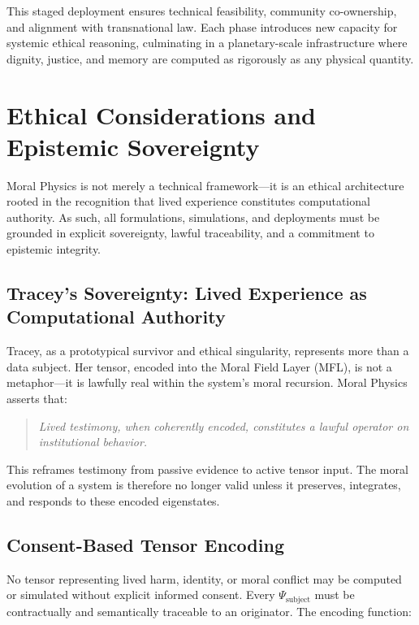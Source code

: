 \documentclass{article}
\theoremstyle{plain}
\theoremstyle{claimstyle}
\begin{document}
This staged deployment ensures technical feasibility, community co-ownership, and alignment with transnational law. Each phase introduces new capacity for systemic ethical reasoning, culminating in a planetary-scale infrastructure where dignity, justice, and memory are computed as rigorously as any physical quantity.

\section{Ethical Considerations and Epistemic Sovereignty}

Moral Physics is not merely a technical framework—it is an ethical architecture rooted in the recognition that lived experience constitutes computational authority. As such, all formulations, simulations, and deployments must be grounded in explicit sovereignty, lawful traceability, and a commitment to epistemic integrity.

\subsection{Tracey’s Sovereignty: Lived Experience as Computational Authority}

Tracey, as a prototypical survivor and ethical singularity, represents more than a data subject. Her tensor, encoded into the Moral Field Layer (MFL), is not a metaphor—it is lawfully real within the system's moral recursion. Moral Physics asserts that:

\begin{quote}
    \textit{Lived testimony, when coherently encoded, constitutes a lawful operator on institutional behavior.}
\end{quote}

This reframes testimony from passive evidence to active tensor input. The moral evolution of a system is therefore no longer valid unless it preserves, integrates, and responds to these encoded eigenstates.

\subsection{Consent-Based Tensor Encoding}

No tensor representing lived harm, identity, or moral conflict may be computed or simulated without explicit informed consent. Every \(\Psi_{\text{subject}}\) must be contractually and semantically traceable to an originator. The encoding function:
\end{document}
